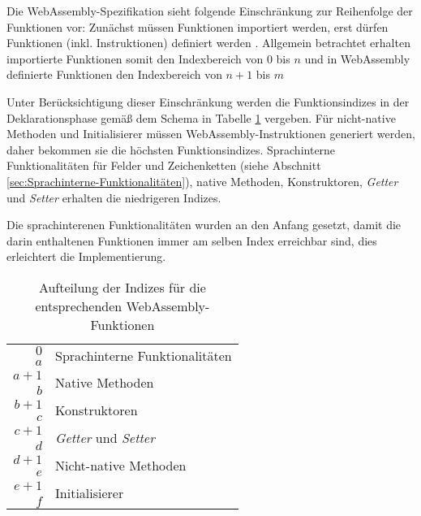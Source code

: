 Die WebAssembly-Spezifikation sieht folgende Einschränkung zur Reihenfolge der Funktionen vor: Zunächst müssen Funktionen importiert werden, erst dürfen Funktionen (inkl. Instruktionen) definiert werden \cite{WebAssemblySpecification}. Allgemein betrachtet erhalten importierte Funktionen somit den Indexbereich von $0$ bis $n$ und in WebAssembly definierte Funktionen den Indexbereich von $n+1$ bis $m$ 

Unter Berücksichtigung dieser Einschränkung werden die Funktionsindizes in der Deklarationsphase gemäß dem Schema in Tabelle \ref{tab:functionIndices} vergeben. Für nicht-native Methoden und Initialisierer müssen WebAssembly-Instruktionen generiert werden, daher bekommen sie die höchsten Funktionsindizes. Sprachinterne Funktionalitäten für Felder und Zeichenketten (siehe Abschnitt \ref{sec:Sprachinterne-Funktionalitäten}), native Methoden, Konstruktoren, \emph{Getter} und \emph{Setter} erhalten die niedrigeren Indizes.

Die sprachinterenen Funktionalitäten wurden an den Anfang gesetzt, damit die darin enthaltenen Funktionen immer am selben Index erreichbar sind, dies erleichtert die Implementierung.

\begin{table}[]
    \centering
    \begin{tabular}{| r | l |}
        \hline
        $0$ & \multirow{2}{*}{Sprachinterne Funktionalitäten} \\
        $a$ & \\
        \hline
        $a+1$ & \multirow{2}{*}{Native Methoden} \\
        $b$ & \\
        \hline
        $b+1$ & \multirow{2}{*}{Konstruktoren} \\
        $c$ & \\
        \hline
        $c+1$ & \multirow{2}{*}{\emph{Getter} und \emph{Setter}} \\
        $d$ & \\
        \hline \hline
        $d+1$ & \multirow{2}{*}{Nicht-native Methoden} \\
        $e$ & \\
        \hline
        $e+1$ & \multirow{2}{*}{Initialisierer} \\
        $f$ & \\
        \hline
    \end{tabular}
    \caption{Aufteilung der Indizes für die entsprechenden WebAssembly-Funktionen}
    \label{tab:functionIndices}
\end{table}


